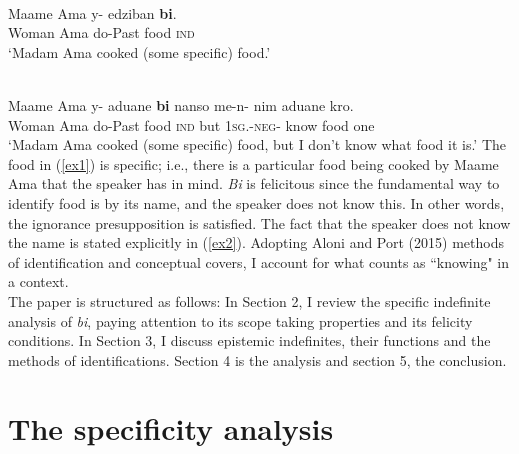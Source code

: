 \documentclass[output=paper,
modfonts
]{langsci/langscibook}
\begin{document}
\ea 
{}\\
\ea\label{ex1}

\gll Maame Ama y- edziban \textbf{bi}. \\
     Woman Ama do-Past food  \textsc{ind}   \\
\glt `Madam Ama cooked (some specific) food.'

\ex\label{ex2}
\\
\gll  Maame Ama y- aduane \textbf{bi} nanso me-n- nim aduane kro. \\
     Woman Ama do-Past food  \textsc{ind} but \textsc{1sg.}-\textsc{neg}- know food one \\ \glt `Madam Ama cooked (some specific) food, but I don't know what food it is.'
\z \z The food in (\ref{ex1}) is specific; i.e., there is a particular food being cooked by Maame Ama that the speaker has in mind. \emph{Bi} is felicitous since the fundamental way to identify food is by its name, and the speaker does not know this. In other words, the ignorance presupposition is satisfied. The fact that the speaker does not know the name is stated explicitly in (\ref{ex2}). Adopting Aloni and Port (2015) methods of identification and conceptual covers, I account for what counts as ``knowing" in a context.\\
The paper is structured as follows: In Section 2, I review the specific indefinite analysis of \emph{bi}, paying attention to its scope taking properties and its felicity conditions. In Section 3, I discuss epistemic indefinites, their functions and the methods of identifications. Section 4 is the analysis and section 5, the conclusion.  


\section{The specificity analysis}
 
\end{document}
